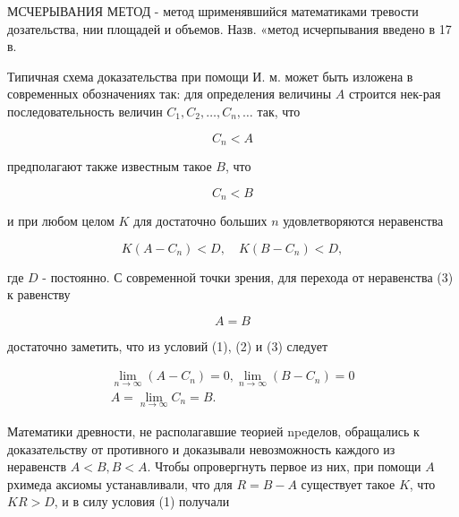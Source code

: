 \documentclass[10pt]{article}
\begin{document}
МСЧЕРЫВАНИЯ МЕТОД - метод шрименявшийся математиками тревости дозательства, нии площадей и объемов. Назв. «метод исчерпывания введено в 17 в.



Типичная схема доказательства при помощи И. м. может быть изложена в современных обозначениях так: для определения величины $A$ строится нек-рая последовательность величин $C_{1}, C_{2}, \ldots, C_{n}, \ldots$ так, что



\[

C_{n}<A

\]



предполагают также известным такое $B$, что



\[

C_{n}<B

\]



и при любом целом $K$ для достаточно больших $n$ удовлетворяются неравенства



\[

K\left(A-C_{n}\right)<D, \quad K\left(B-C_{n}\right)<D,

\]



где $D$ - постоянно. С современной точки зрения, для перехода от неравенства (3) к равенству



\[

A=B

\]



достаточно заметить, что из условий (1), (2) и (3) следует



\[

\begin{gathered}

\lim _{n \rightarrow \infty}\left(A-C_{n}\right)=0, \lim _{n \rightarrow \infty}\left(B-C_{n}\right)=0 \\

A=\lim _{n \rightarrow \infty} C_{n}=B .

\end{gathered}

\]



Математики древности, не располагавшие теорией npeделов, обращались к доказательству от противного и доказывали невозможность каждого из неравенств $A<B, B<A$. Чтобы опровергнуть первое из них, при помощи $A$ рхимеда аксиомы устанавливали, что для $R=B-A$ существует такое $K$, что $K R>D$, и в силу условия (1) получали
\end{document}
